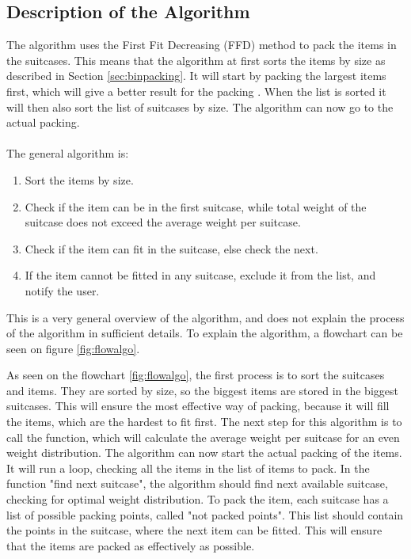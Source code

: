 \subsection{Description of the Algorithm}
The algorithm uses the First Fit Decreasing (FFD) method to pack the items in the suitcases. This means that the algorithm at first sorts the items by size as described in Section \ref{sec:binpacking}. It will start by packing the largest items first, which will give a better result for the packing \citep{binpackingsource}. When the list is sorted it will then also sort the list of suitcases by size. The algorithm can now go to the actual packing.\\
\\
The general algorithm is:
\begin{enumerate}
	\item Sort the items by size.
	\item Check if the item can be in the first suitcase, while total weight of the suitcase does not exceed the average weight per suitcase.
	\item Check if the item can fit in the suitcase, else check the next.
	\item If the item cannot be fitted in any suitcase, exclude it from the list, and notify the user.
\end{enumerate}

This is a very general overview of the algorithm, and does not explain the process of the algorithm in sufficient details. To explain the algorithm, a flowchart can be seen on figure \ref{fig:flowalgo}.


As seen on the flowchart \ref{fig:flowalgo}, the first process is to sort the suitcases and items. They are sorted by size, so the biggest items are stored in the biggest suitcases. This will ensure the most effective way of packing, because it will fill the items, which are the hardest to fit first. The next step for this algorithm is to call the function, which will calculate the average weight per suitcase for an even weight distribution. The algorithm can now start the actual packing of the items.
It will run a loop, checking all the items in the list of items to pack. In the function "find next suitcase", the algorithm should find next available suitcase, checking for optimal weight distribution. To pack the item, each suitcase has a list of possible packing points, called "not packed points". This list should contain the points in the suitcase, where the next item can be fitted. This will ensure that the items are packed as effectively as possible.

